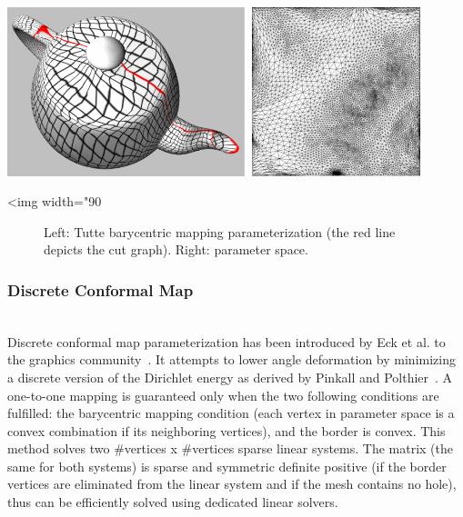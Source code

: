 \begin{center}
    \label{Surface_mesh_parameterization-fig-uniform}
    \begin{ccTexOnly}
      \includegraphics[width=0.9\textwidth]{Surface_mesh_parameterization/uniform}
    \end{ccTexOnly}
    \begin{ccHtmlOnly}
        <img width="90%
    \end{ccHtmlOnly}
    \begin{figure}[h]
        \caption{Left: Tutte barycentric mapping parameterization (the red
                 line depicts the cut graph). Right: parameter space.}
    \end{figure}
\end{center}


\subsubsection{Discrete Conformal Map}

  \\

Discrete conformal map parameterization has been introduced by Eck et
al. to the graphics community~\cite{cgal:eddhls-maam-95}. It attempts to
lower angle deformation by minimizing a discrete version of the
Dirichlet energy as derived by Pinkall and
Polthier~\cite{cgal:pp-cdmsc-93}. A one-to-one mapping is guaranteed
only when the two following conditions are fulfilled: the barycentric mapping
condition (each vertex in parameter space is a convex combination if
its neighboring vertices), and the border is convex.
This method solves two \#vertices x \#vertices sparse linear
systems. The matrix (the same for both systems) is sparse and symmetric definite
positive (if the border vertices are eliminated from the linear system
and if the mesh contains no hole),
thus can be efficiently solved using dedicated linear solvers.

